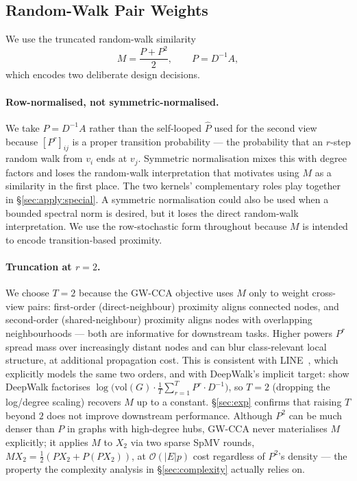 \documentclass{article}
\begin{document}
\subsection{Random-Walk Pair Weights}
\label{sec:apply:M}
We use the truncated random-walk similarity
\begin{equation}\label{eq:M}
M = \frac{P + P^2}{2}, \qquad P = D^{-1}A,
\end{equation}
which encodes two deliberate design decisions.

\paragraph{Row-normalised, not symmetric-normalised.}
We take $P = D^{-1}A$ rather than the self-looped $\widehat{P}$ used for
the second view because $[P^r]_{ij}$ is a proper transition probability --- the
probability that an $r$-step random walk from $v_i$ ends at $v_j$. Symmetric
normalisation mixes this with degree factors and loses the random-walk
interpretation that motivates using $M$ as a similarity in the first place.
The two kernels' complementary roles play together in
\S\ref{sec:apply:special}. A symmetric normalisation could also be used
when a bounded spectral norm is desired, but it loses the direct
random-walk interpretation. We use the row-stochastic form throughout
because $M$ is intended to encode transition-based proximity.

\paragraph{Truncation at $r = 2$.}
We choose $T = 2$ because the GW-CCA objective uses $M$ only to weight
cross-view pairs: first-order (direct-neighbour) proximity aligns
connected nodes, and second-order (shared-neighbour) proximity aligns
nodes with overlapping neighbourhoods --- both are informative for
downstream tasks. Higher powers $P^r$ spread mass over increasingly
distant nodes and can blur class-relevant local structure, at additional
propagation cost. This is consistent with LINE~\citep{tang2015line},
which explicitly models the same two orders, and with DeepWalk's implicit
target: \citet{qiu2018network} show DeepWalk factorises
$\log\!\big(\mathrm{vol}(G) \cdot \tfrac{1}{T}\sum_{r=1}^{T} P^r \cdot D^{-1}\big)$,
so $T = 2$ (dropping the log/degree scaling) recovers $M$ up to a
constant. \S\ref{sec:exp} confirms that raising $T$ beyond $2$ does not
improve downstream performance. Although $P^2$ can be much denser than
$P$ in graphs with high-degree hubs, GW-CCA never materialises $M$
explicitly; it applies $M$ to $X_2$ via two sparse SpMV rounds,
$M X_2 = \tfrac{1}{2}(P X_2 + P(P X_2))$, at $\mathcal{O}(|E| p)$ cost
regardless of $P^2$'s density --- the property the complexity analysis in
\S\ref{sec:complexity} actually relies on.
\end{document}
